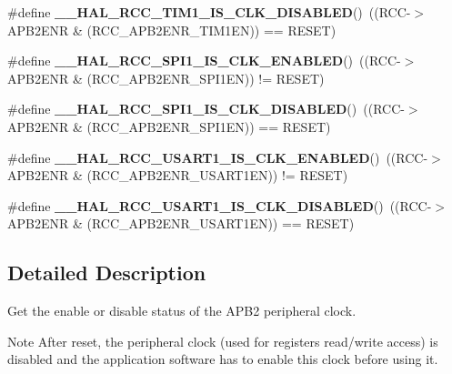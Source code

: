 \begin{DoxyCompactItemize}
\#define {\bfseries \+\_\+\+\_\+\+H\+A\+L\+\_\+\+R\+C\+C\+\_\+\+T\+I\+M1\+\_\+\+I\+S\+\_\+\+C\+L\+K\+\_\+\+D\+I\+S\+A\+B\+L\+ED}()~((R\+CC-\/$>$A\+P\+B2\+E\+NR \& (R\+C\+C\+\_\+\+A\+P\+B2\+E\+N\+R\+\_\+\+T\+I\+M1\+EN)) == R\+E\+S\+ET)
\item 
\mbox{\label{group___r_c_c___a_p_b2___peripheral___clock___enable___disable___status_gab1787d7cdf591c099b8d96848aee835e}} 
\#define {\bfseries \+\_\+\+\_\+\+H\+A\+L\+\_\+\+R\+C\+C\+\_\+\+S\+P\+I1\+\_\+\+I\+S\+\_\+\+C\+L\+K\+\_\+\+E\+N\+A\+B\+L\+ED}()~((R\+CC-\/$>$A\+P\+B2\+E\+NR \& (R\+C\+C\+\_\+\+A\+P\+B2\+E\+N\+R\+\_\+\+S\+P\+I1\+EN)) != R\+E\+S\+ET)
\item 
\mbox{\label{group___r_c_c___a_p_b2___peripheral___clock___enable___disable___status_gabd506be27916f029d2214e88bc48f6df}} 
\#define {\bfseries \+\_\+\+\_\+\+H\+A\+L\+\_\+\+R\+C\+C\+\_\+\+S\+P\+I1\+\_\+\+I\+S\+\_\+\+C\+L\+K\+\_\+\+D\+I\+S\+A\+B\+L\+ED}()~((R\+CC-\/$>$A\+P\+B2\+E\+NR \& (R\+C\+C\+\_\+\+A\+P\+B2\+E\+N\+R\+\_\+\+S\+P\+I1\+EN)) == R\+E\+S\+ET)
\item 
\mbox{\label{group___r_c_c___a_p_b2___peripheral___clock___enable___disable___status_ga59bd3cd20df76f885695fcdad1edce27}} 
\#define {\bfseries \+\_\+\+\_\+\+H\+A\+L\+\_\+\+R\+C\+C\+\_\+\+U\+S\+A\+R\+T1\+\_\+\+I\+S\+\_\+\+C\+L\+K\+\_\+\+E\+N\+A\+B\+L\+ED}()~((R\+CC-\/$>$A\+P\+B2\+E\+NR \& (R\+C\+C\+\_\+\+A\+P\+B2\+E\+N\+R\+\_\+\+U\+S\+A\+R\+T1\+EN)) != R\+E\+S\+ET)
\item 
\mbox{\label{group___r_c_c___a_p_b2___peripheral___clock___enable___disable___status_ga22c9d59ac6062298a71eed0d6a4a9afd}} 
\#define {\bfseries \+\_\+\+\_\+\+H\+A\+L\+\_\+\+R\+C\+C\+\_\+\+U\+S\+A\+R\+T1\+\_\+\+I\+S\+\_\+\+C\+L\+K\+\_\+\+D\+I\+S\+A\+B\+L\+ED}()~((R\+CC-\/$>$A\+P\+B2\+E\+NR \& (R\+C\+C\+\_\+\+A\+P\+B2\+E\+N\+R\+\_\+\+U\+S\+A\+R\+T1\+EN)) == R\+E\+S\+ET)
\end{DoxyCompactItemize}


\subsection{Detailed Description}
Get the enable or disable status of the A\+P\+B2 peripheral clock. 

\begin{DoxyNote}{Note}
After reset, the peripheral clock (used for registers read/write access) is disabled and the application software has to enable this clock before using it. 
\end{DoxyNote}
